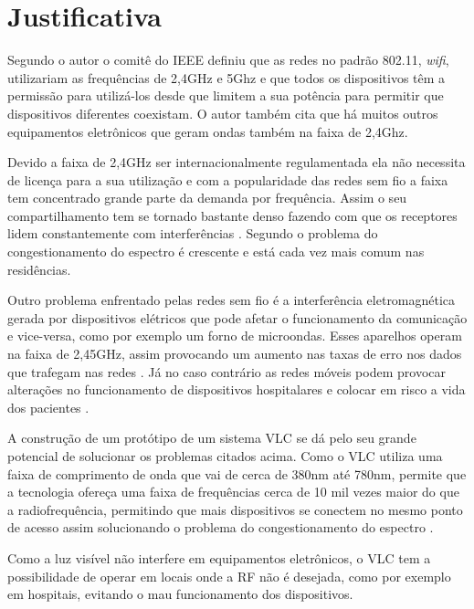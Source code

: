 \chapter{Justificativa}

Segundo o autor  o comitê do IEEE definiu que as redes no padrão 802.11, \textit{wifi}, utilizariam as frequências de 2,4GHz e 5Ghz e que todos os dispositivos têm a permissão para utilizá-los desde que limitem a sua potência para permitir que dispositivos diferentes coexistam. O autor  também cita que há muitos outros equipamentos eletrônicos que geram ondas também na faixa de 2,4Ghz. 

Devido a faixa de 2,4GHz ser internacionalmente regulamentada ela não necessita de licença para a sua utilização e com a popularidade das redes sem fio a faixa tem concentrado grande parte da demanda por frequência. Assim o seu compartilhamento tem se tornado bastante denso fazendo com que os receptores lidem constantemente com interferências \cite{barros}. Segundo  o problema do congestionamento do espectro é crescente e está cada vez mais comum nas residências.

Outro problema enfrentado pelas redes sem fio é a interferência eletromagnética gerada por dispositivos elétricos que pode afetar o funcionamento da comunicação e vice-versa, como por exemplo um forno de microondas. Esses aparelhos operam na faixa de 2,45GHz, assim provocando um aumento nas taxas de erro nos dados que trafegam nas redes \cite{barros}. Já no caso contrário as redes móveis podem provocar alterações no funcionamento de dispositivos hospitalares e colocar em risco a vida dos pacientes \cite{cabral}.

A construção de um protótipo de um sistema VLC se dá pelo seu grande potencial de solucionar os problemas citados acima. Como o VLC utiliza uma faixa de comprimento de onda que vai de cerca de 380nm até 780nm, permite que a tecnologia ofereça uma faixa de frequências cerca de 10 mil vezes maior do que a radiofrequência, permitindo que mais dispositivos se conectem no mesmo ponto de acesso assim solucionando o problema do congestionamento do espectro \cite{conceiccao2015comunicaccao}. 

Como a luz visível não interfere em equipamentos eletrônicos, o VLC tem a possibilidade de operar  em locais onde a RF não é desejada, como por exemplo em hospitais, evitando o mau funcionamento dos dispositivos.

